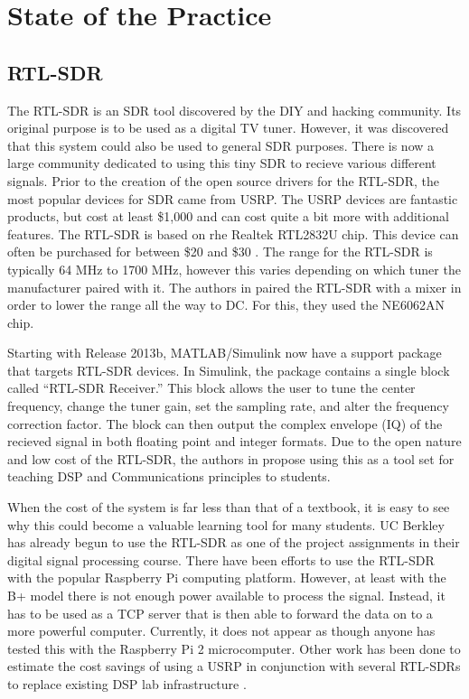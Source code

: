 
\section{State of the Practice}

\subsection{RTL-SDR}

	The RTL-SDR is an SDR tool discovered by the DIY and hacking community. Its original purpose is to be used as a digital TV tuner. However, it was discovered that this system could also be used to general SDR purposes. There is now a large community dedicated to using this tiny SDR to recieve various different signals. Prior to the creation of the open source drivers for the RTL-SDR, the most popular devices for SDR came from USRP. The USRP devices are fantastic products, but cost at least \$1,000 and can cost quite a bit more with additional features. The RTL-SDR is based on rhe Realtek RTL2832U chip. This device can often be purchased for between \$20 and \$30 \cite{6526525}. The range for the RTL-SDR is typically 64 MHz	to 1700 MHz, however this varies depending on which tuner the manufacturer paired with it. The authors in \cite{6526525} paired the RTL-SDR with a mixer in order to lower the range all the way to DC. For this, they used the NE6062AN chip.  
	
	Starting with Release 2013b, MATLAB/Simulink now have a support package that targets RTL-SDR devices. In Simulink, the package contains a single block called ``RTL-SDR Receiver.'' This block allows the user to tune the center frequency, change the tuner gain, set the sampling rate, and alter the frequency correction factor. The block can then output the complex envelope (IQ) of the recieved signal in both floating point and integer formats\cite{6893337}.  Due to the open nature and low cost of the RTL-SDR, the authors in \cite{6821718} propose using this as a tool set for teaching DSP and Communications principles to students. 
	
	When the cost of the system is far less than that of a
	textbook, it is easy to see why this could become a valuable learning tool for many students. UC Berkley has already begun to use the RTL-SDR as one of the project assignments in their digital signal processing course. 	There have been efforts to use the RTL-SDR with the popular Raspberry Pi computing platform. However, at least with the B+ model there is not enough power available to process the signal. Instead, it has to be used as a TCP server that is then able to forward the data on to a more powerful computer\cite{6938691}. Currently, it does not appear as though anyone has tested this with the Raspberry Pi 2 microcomputer. Other work has been done to estimate the cost savings of using a USRP in conjunction with several RTL-SDRs to replace existing DSP lab infrastructure \cite{6726630}. 
	
